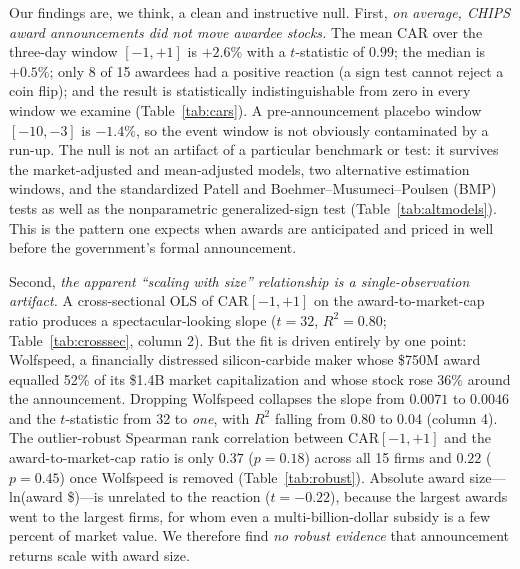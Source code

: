 \documentclass[12pt]{article}
\begin{document}
Our findings are, we think, a clean and instructive null. First, \emph{on average, CHIPS
award announcements did not move awardee stocks.} The mean CAR over the three-day window
$[-1,+1]$ is $+2.6\%$ with a $t$-statistic of $0.99$; the median is $+0.5\%$; only 8 of 15
awardees had a positive reaction (a sign test cannot reject a coin flip); and the result is
statistically indistinguishable from zero in every window we examine
(Table~\ref{tab:cars}). A pre-announcement placebo window $[-10,-3]$ is $-1.4\%$, so the
event window is not obviously contaminated by a run-up. The null is not an artifact of a
particular benchmark or test: it survives the market-adjusted and mean-adjusted models, two
alternative estimation windows, and the standardized Patell and Boehmer--Musumeci--Poulsen
(BMP) tests as well as the nonparametric generalized-sign test (Table~\ref{tab:altmodels}).
This is the pattern one expects when awards are anticipated and priced in well before the
government's formal announcement.

Second, \emph{the apparent ``scaling with size'' relationship is a single-observation
artifact.} A cross-sectional OLS of CAR$[-1,+1]$ on the award-to-market-cap ratio produces
a spectacular-looking slope ($t=32$, $R^2=0.80$; Table~\ref{tab:crosssec}, column 2). But
the fit is driven entirely by one point: Wolfspeed, a financially distressed
silicon-carbide maker whose \$750M award equalled 52\% of its \$1.4B market
capitalization and whose stock rose 36\% around the announcement. Dropping Wolfspeed
collapses the slope from $0.0071$ to $0.0046$ and the $t$-statistic from 32 to
\emph{one}, with $R^2$ falling from 0.80 to 0.04 (column 4). The outlier-robust Spearman
rank correlation between CAR$[-1,+1]$ and the award-to-market-cap ratio is only $0.37$
($p=0.18$) across all 15 firms and $0.22$ ($p=0.45$) once Wolfspeed is removed
(Table~\ref{tab:robust}). Absolute award size---ln(award \$)---is unrelated to the reaction
($t=-0.22$), because the largest awards went to the largest firms, for whom even a
multi-billion-dollar subsidy is a few percent of market value. We therefore find \emph{no
robust evidence} that announcement returns scale with award size.
\end{document}
